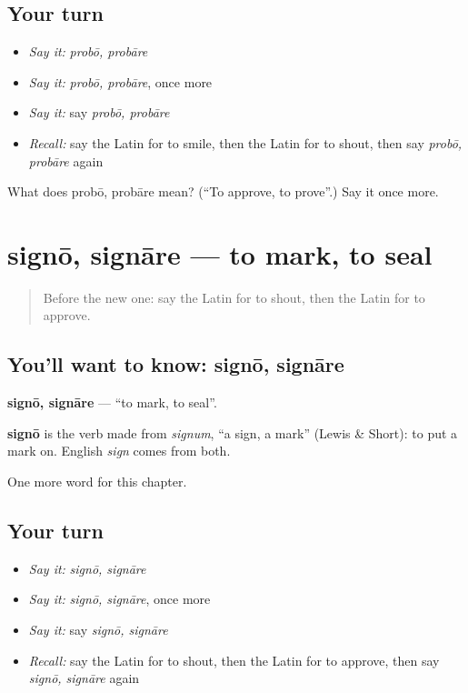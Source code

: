 \subsection*{Your turn}
\begin{itemize}
\raggedright
  \item \emph{Say it:} \emph{probō, probāre}
  \item \emph{Say it:} \emph{probō, probāre}, once more
  \item \emph{Say it:} say \emph{probō, probāre}
  \item \emph{Recall:} say the Latin for to smile, then the Latin for to shout, then say \emph{probō, probāre} again
\end{itemize}

\begin{tcolorbox}[breakable,colback=teal!4,colframe=teal!35!black,title={Before you move on}]
What does probō, probāre mean? (\textquotedblleft{}To approve, to prove\textquotedblright{}.) Say it once more.
\end{tcolorbox}
\section[signō, signāre]{signō, signāre — to mark, to seal}

\label{lesson:LA-C166-signo}



\begin{quote}
Before the new one: say the Latin for to shout, then the Latin for to approve.
\end{quote}

\subsection*{You'll want to know: signō, signāre}
\textbf{signō, signāre} — \textquotedblleft{}to mark, to seal\textquotedblright{}.

\begin{cousinweb}
\textbf{signō} is the verb made from \emph{signum}, \textquotedblleft{}a sign, a mark\textquotedblright{} (Lewis \& Short): to put a mark on. English \emph{sign} comes from both.
\end{cousinweb}

\begin{grammarlens}[title={What you've built}]
One more word for this chapter.
\end{grammarlens}

\subsection*{Your turn}
\begin{itemize}
\raggedright
  \item \emph{Say it:} \emph{signō, signāre}
  \item \emph{Say it:} \emph{signō, signāre}, once more
  \item \emph{Say it:} say \emph{signō, signāre}
  \item \emph{Recall:} say the Latin for to shout, then the Latin for to approve, then say \emph{signō, signāre} again
\end{itemize}

